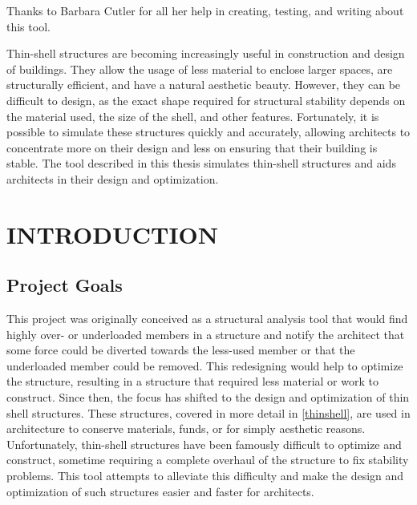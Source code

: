 \documentclass{thesis}
\author{R. Allan Pendergrast}
\begin{document}
 
\titlepage             %
\tableofcontents       %
\listoftables          %
\listoffigures         %

Thanks to Barbara Cutler for all her help in creating, testing, and writing about this tool.

Thin-shell structures are becoming increasingly useful in construction and design of buildings.  They allow the usage of less material to enclose
larger spaces, are structurally efficient, and have a natural aesthetic beauty.  However, they can be difficult to design, as the exact shape
required for structural stability depends on the material used, the size of the shell, and other features.  Fortunately, it is possible to simulate
these structures quickly and accurately, allowing architects to concentrate more on their design and less on ensuring that their building is
stable.  The tool described in this thesis simulates thin-shell structures and aids architects in their design and optimization.

\chapter{INTRODUCTION}

\section{Project Goals}
This project was originally conceived as a structural analysis tool that would find highly over- or underloaded members in a structure
and notify the architect that some force could be diverted towards the less-used member or that the underloaded member could be
removed.  This redesigning would help to optimize the structure, resulting in a structure that required less material or work to construct.
Since then, the focus has shifted to the design and optimization of thin shell structures.  These structures, covered in more detail in
\ref{thinshell}, are used in architecture to conserve materials, funds, or for simply aesthetic reasons.  Unfortunately, thin-shell
structures have been famously difficult to optimize and construct, sometime requiring a complete overhaul of the structure to fix stability
problems. This tool attempts to alleviate this difficulty and make the design and optimization of such structures easier and faster for architects.
\end{document}
